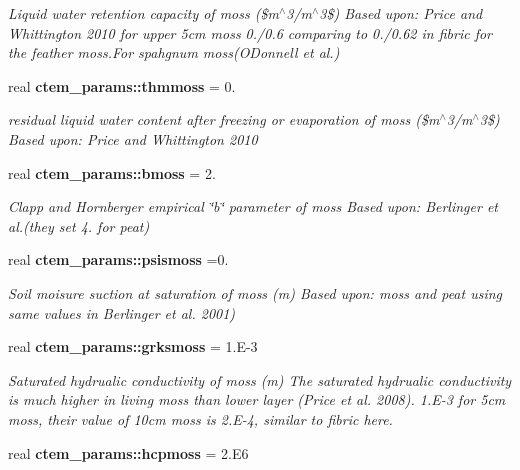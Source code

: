 \begin{DoxyCompactItemize}
\begin{DoxyCompactList}\small\item\em Liquid water retention capacity of moss (\$m$^\wedge$3/m$^\wedge$3\$) Based upon\+: Price and Whittington 2010 for upper 5cm moss 0./0.6 comparing to 0./0.62 in fibric for the feather moss.\+For spahgnum moss(O\textquotesingle{}Donnell et al.) \end{DoxyCompactList}\item 
\hypertarget{namespacectem__params_a1ec880bc9f809448914c2f7cf94d4493}{}real {\bfseries ctem\+\_\+params\+::thmmoss} = 0.\label{namespacectem__params_a1ec880bc9f809448914c2f7cf94d4493}

\begin{DoxyCompactList}\small\item\em residual liquid water content after freezing or evaporation of moss (\$m$^\wedge$3/m$^\wedge$3\$) Based upon\+: Price and Whittington 2010 \end{DoxyCompactList}\item 
\hypertarget{namespacectem__params_a23ae1a2b2657682100b05a0a5554f36f}{}real {\bfseries ctem\+\_\+params\+::bmoss} = 2.\label{namespacectem__params_a23ae1a2b2657682100b05a0a5554f36f}

\begin{DoxyCompactList}\small\item\em Clapp and Hornberger empirical \char`\"{}b\char`\"{} parameter of moss Based upon\+: Berlinger et al.(they set 4. for peat) \end{DoxyCompactList}\item 
\hypertarget{namespacectem__params_a01402bac0f2145c50c4b89642cb58a80}{}real {\bfseries ctem\+\_\+params\+::psismoss} =0.\label{namespacectem__params_a01402bac0f2145c50c4b89642cb58a80}

\begin{DoxyCompactList}\small\item\em Soil moisure suction at saturation of moss (m) Based upon\+: moss and peat using same values in Berlinger et al. 2001) \end{DoxyCompactList}\item 
\hypertarget{namespacectem__params_ac6a30c2dccbba72bd498bed33c71aef4}{}real {\bfseries ctem\+\_\+params\+::grksmoss} = 1.\+E-\/3\label{namespacectem__params_ac6a30c2dccbba72bd498bed33c71aef4}

\begin{DoxyCompactList}\small\item\em Saturated hydrualic conductivity of moss (m) The saturated hydrualic conductivity is much higher in living moss than lower layer (Price et al. 2008). 1.\+E-\/3 for 5cm moss, their value of 10cm moss is 2.\+E-\/4, similar to fibric here. \end{DoxyCompactList}\item 
\hypertarget{namespacectem__params_a0f0a4776ea1f469d534620de349cc638}{}real {\bfseries ctem\+\_\+params\+::hcpmoss} = 2.\+E6\label{namespacectem__params_a0f0a4776ea1f469d534620de349cc638}


\end{DoxyCompactItemize}

